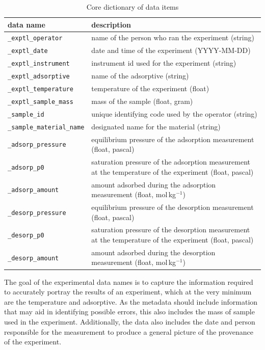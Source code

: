 \documentclass[journal=langd5,manuscript=article]{achemso}
\renewcommand{\arraystretch}{1.2}
\begin{document}
\begin{table}
  \renewcommand{\arraystretch}{1.5}
  \caption{Core dictionary of data items}
  \label{tbl:example}
  \begin{tabular}{lp{7cm}}
    \toprule
    data name & description  \\
    \midrule
    \texttt{\_exptl\_operator}  & name of the person who ran the experiment (string)  \\
    \texttt{\_exptl\_date} & date and time of the experiment (YYYY-MM-DD) \\
    \texttt{\_exptl\_instrument}  & instrument id used for the experiment (string)  \\
    \texttt{\_exptl\_adsorptive}  & name of the adsorptive (string)  \\
    \texttt{\_exptl\_temperature}  & temperature of the experiment (float)  \\
    \texttt{\_exptl\_sample\_mass}  & mass of the sample (float, gram) \\
    \texttt{\_sample\_id}  & unique identifying code used by the operator (string)\\
    \texttt{\_sample\_material\_name}  & designated name for the material (string) \\
    \texttt{\_adsorp\_pressure} & equilibrium pressure of the adsorption measurement (float, pascal)\\
    \texttt{\_adsorp\_p0} & saturation pressure of the adsorption measurement at the temperature of the experiment (float, pascal) \\
    \texttt{\_adsorp\_amount} & amount adsorbed during the adsorption measurement (float, mol$\,$kg$^{-1}$) \\
    \texttt{\_desorp\_pressure} & equilibrium  pressure of the desorption measurement (float, pascal) \\
    \texttt{\_desorp\_p0} & saturation pressure of the desorption measurement at the temperature of the experiment (float, pascal) \\
    \texttt{\_desorp\_amount} & amount adsorbed during the desorption measurement (float, mol$\,$kg$^{-1}$) \\
    \bottomrule
  \end{tabular}
\end{table}

The goal of the experimental data names is to capture the information required to accurately portray the results of an experiment, which at the very minimum are the temperature and adsorptive.
As the metadata should include information that may aid in identifying possible errors, this also includes the mass of sample used in the experiment.
Additionally, the data also includes the date and person responsible for the measurement to produce a general picture of the provenance of the experiment.
\end{document}

